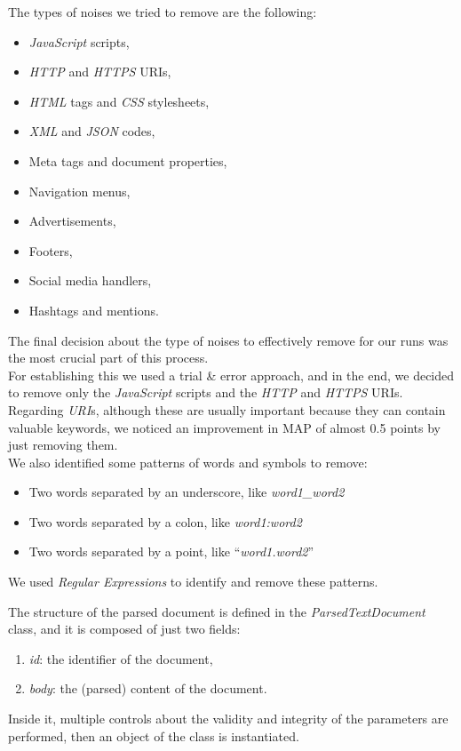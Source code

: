 The types of noises we tried to remove are the following:
\begin{itemize}
\item \textit{JavaScript} scripts,
\item \textit{HTTP} and \textit{HTTPS} URIs,
\item \textit{HTML} tags and \textit{CSS} stylesheets,
\item \textit{XML} and \textit{JSON} codes,
\item Meta tags and document properties,
\item Navigation menus,
\item Advertisements,
\item Footers,
\item Social media handlers,
\item Hashtags and mentions.
\end{itemize}
The final decision about the type of noises to effectively remove for our runs was the most crucial part of this process. \\
For establishing this we used a trial \& error approach, and in the end, we decided to remove only the \textit{JavaScript} scripts and the \textit{HTTP} and \textit{HTTPS} URIs. Regarding \textit{URI}s, although these are usually important because they can contain valuable keywords, we noticed an improvement in \ac{MAP} of almost 0.5 points by just removing them. \\
We also identified some patterns of words and symbols to remove:
\begin{itemize}
\item Two words separated by an underscore, like \textit{word1\_word2}
\item Two words separated by a colon, like \textit{word1:word2}
\item Two words separated by a point, like ``\textit{word1.word2}''
\end{itemize}
We used \textit{Regular Expressions} \cite{regexdefinition} to identify and remove these patterns.  

The structure of the parsed document is defined in the \textit{ParsedTextDocument} class, and it is composed of just two fields:
\begin{enumerate}
\item \textit{id}: the identifier of the document,
\item \textit{body}: the (parsed) content of the document.
\end{enumerate}
Inside it, multiple controls about the validity and integrity of the parameters are performed, then an object of the class is instantiated.


